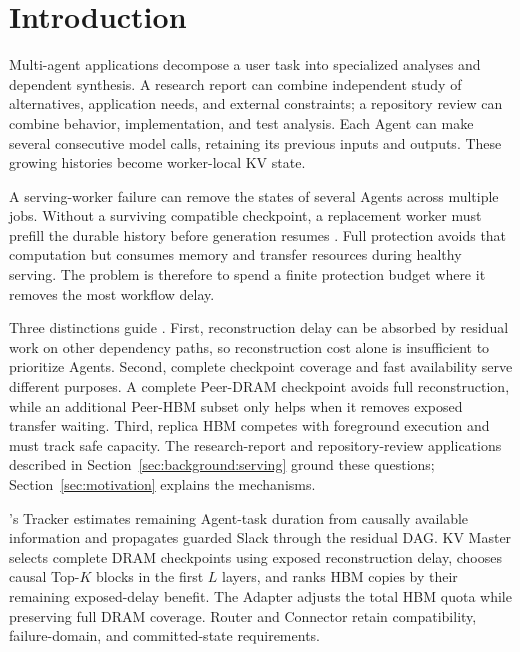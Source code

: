 \section{Introduction}\label{sec:introduction}

Multi-agent applications decompose a user task into specialized analyses
and dependent synthesis. A research report can combine independent study
of alternatives, application needs, and external constraints; a repository
review can combine behavior, implementation, and test analysis. Each Agent
can make several consecutive model calls, retaining its previous inputs and
outputs. These growing histories become worker-local KV state.

A serving-worker failure can remove the states of several Agents across
multiple jobs. Without a surviving compatible checkpoint, a replacement
worker must prefill the durable history before generation resumes
\cite{strati2024dejavu,cao2026lumen}. Full protection avoids that computation
but consumes memory and transfer resources during healthy serving. The
problem is therefore to spend a finite protection budget where it removes
the most workflow delay.

Three distinctions guide \system. First, reconstruction delay can be
absorbed by residual work on other dependency paths, so reconstruction cost
alone is insufficient to prioritize Agents. Second, complete checkpoint
coverage and fast availability serve different purposes. A complete
Peer-DRAM checkpoint avoids full reconstruction, while an additional
Peer-HBM subset only helps when it removes exposed transfer waiting.
Third, replica HBM competes with foreground execution and must track safe
capacity. The research-report and repository-review applications described in
Section~\ref{sec:background:serving} ground these questions; Section~\ref{sec:motivation} explains the
mechanisms.

\system's Tracker estimates remaining Agent-task duration from causally
available information and propagates guarded Slack through the residual
DAG. KV Master selects complete DRAM checkpoints using exposed
reconstruction delay, chooses causal Top-$K$ blocks in the first $L$
layers, and ranks HBM copies by their remaining exposed-delay benefit.
The Adapter adjusts the total HBM quota while preserving full DRAM
coverage. Router and Connector retain compatibility, failure-domain,
and committed-state requirements.


